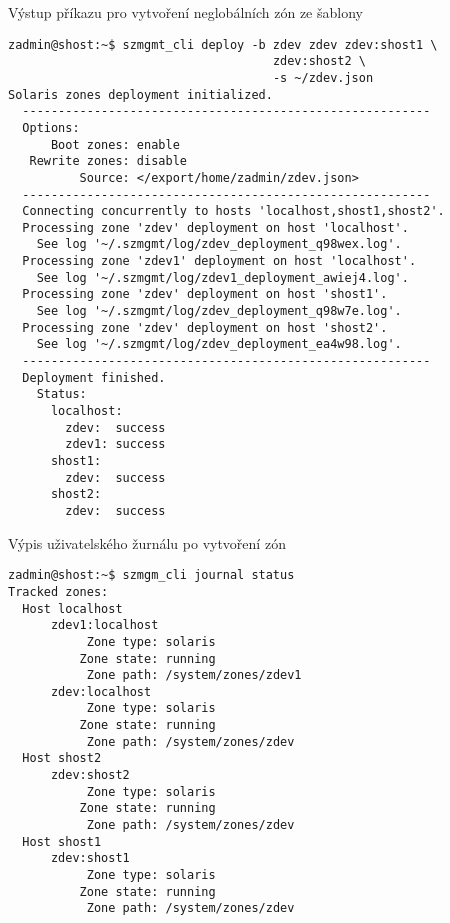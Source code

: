 \begin{listing}[ht]
  \caption{Výstup příkazu pro vytvoření neglobálních zón ze šablony}
  \begin{verbatim}
zadmin@shost:~$ szmgmt_cli deploy -b zdev zdev zdev:shost1 \
                                     zdev:shost2 \
                                     -s ~/zdev.json 
Solaris zones deployment initialized.
  ---------------------------------------------------------
  Options:
      Boot zones: enable
   Rewrite zones: disable
          Source: </export/home/zadmin/zdev.json>  
  ---------------------------------------------------------
  Connecting concurrently to hosts 'localhost,shost1,shost2'.
  Processing zone 'zdev' deployment on host 'localhost'.
    See log '~/.szmgmt/log/zdev_deployment_q98wex.log'.
  Processing zone 'zdev1' deployment on host 'localhost'.
    See log '~/.szmgmt/log/zdev1_deployment_awiej4.log'.
  Processing zone 'zdev' deployment on host 'shost1'.
    See log '~/.szmgmt/log/zdev_deployment_q98w7e.log'.
  Processing zone 'zdev' deployment on host 'shost2'.
    See log '~/.szmgmt/log/zdev_deployment_ea4w98.log'.
  ---------------------------------------------------------
  Deployment finished.
    Status:
      localhost:
        zdev:  success
        zdev1: success
      shost1:
        zdev:  success
      shost2:
        zdev:  success
  \end{verbatim}
  \label{code:test:deployment}
\end{listing}

\begin{listing}[ht]
  \caption{Výpis uživatelského žurnálu po vytvoření zón}  
  \begin{verbatim}
zadmin@shost:~$ szmgm_cli journal status
Tracked zones:
  Host localhost
      zdev1:localhost
           Zone type: solaris
          Zone state: running
           Zone path: /system/zones/zdev1
      zdev:localhost
           Zone type: solaris
          Zone state: running
           Zone path: /system/zones/zdev
  Host shost2
      zdev:shost2
           Zone type: solaris
          Zone state: running                      
           Zone path: /system/zones/zdev
  Host shost1
      zdev:shost1
           Zone type: solaris
          Zone state: running
           Zone path: /system/zones/zdev
  \end{verbatim}
  \label{code:test:journal}
\end{listing}


